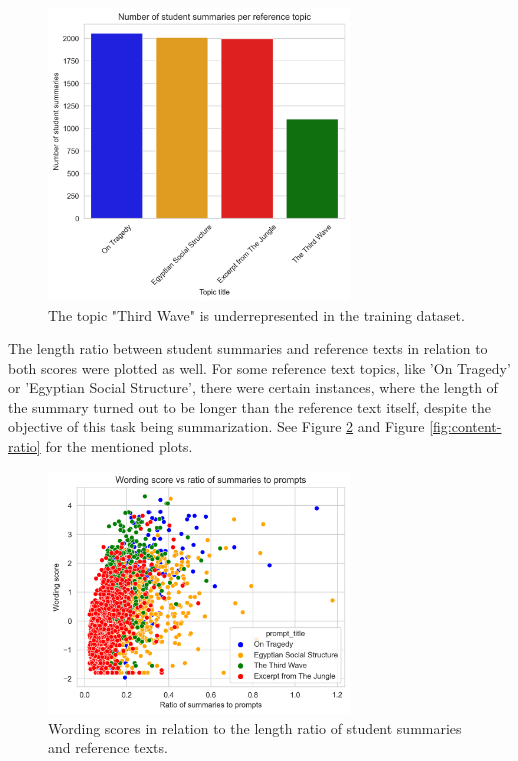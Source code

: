 \begin{figure}[H]
\begin{center}
\includegraphics[width=80mm,scale=0.75]{img/number_of_texts_per_prompt.png}
\end{center}
\caption[Number of student summaries per topic]{The topic "Third Wave" is underrepresented in the training dataset.}
\label{fig:num-of-texts-per-prompt}
\end{figure}
\pagebreak
\noindent The length ratio between student summaries and reference texts in relation to both scores were plotted as well. For some reference text topics, like 'On Tragedy' or 'Egyptian Social Structure', there were certain instances, where the length of the summary turned out to be longer than the reference text itself, despite the objective of this task being summarization.
See Figure \ref{fig:wording-ratio} and Figure \ref{fig:content-ratio} for the mentioned plots.\\


\begin{figure}[H]
\begin{center}
\includegraphics[width=80mm,scale=0.75]{img/wording_ratio_summaries_to_prompts.png}
\end{center}
\caption{Wording scores in relation to the length ratio of student summaries and reference texts.}
\label{fig:wording-ratio}
\end{figure}


